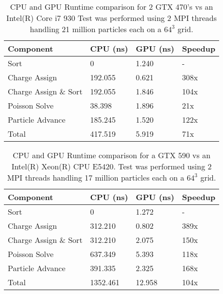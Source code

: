 \noindent \begin{table}[h]
\begin{tabular}{| p{4.0cm} | p{3.5cm} | p{2.5cm} | p{4.0cm} |}
\hline
Component & CPU (ns) & GPU (ns) & Speedup \\ \hline
Sort & 0 & 1.240 & - \\ \hline
Charge Assign & 192.055 & 0.621 & 308x \\ \hline
Charge Assign \& Sort & 192.055 & 1.846 & 104x \\ \hline
Poisson Solve & 38.398 & 1.896 & 21x \\ \hline
Particle Advance & 185.245 & 1.520 & 122x \\ \hline
Total\footnote[1] & 417.519 & 5.919 & 71x \\ \hline
\end{tabular}
\caption{CPU and GPU Runtime comparison for 2 GTX 470's vs an Intel(R) Core i7 930 Test was performed using 2 MPI threads handling 21 million particles each on a $64^3$ grid.}
\label{tab:speedup} 
\end{table}

\noindent \begin{table}[h]
\begin{tabular}{| p{4.0cm} | p{3.5cm} | p{2.5cm} | p{4.0cm} |}
\hline
Component & CPU (ns) & GPU (ns) & Speedup \\ \hline
Sort & 0 & 1.272 & - \\ \hline
Charge Assign & 312.210 & 0.802 & 389x \\ \hline
Charge Assign \& Sort & 312.210 & 2.075 & 150x \\ \hline
Poisson Solve & 637.349 & 5.393 & 118x \\ \hline
Particle Advance & 391.335 & 2.325 & 168x \\ \hline
Total\footnote[1] & 1352.461 & 12.958 & 104x \\ \hline
\end{tabular}
\caption{CPU and GPU Runtime comparison for a GTX 590 vs an Intel(R) Xeon(R) CPU E5420. Test was performed using 2 MPI threads handling 17 million particles each on a $64^3$ grid.}
\label{tab:speedup2} 
\end{table} 




\clearpage
\newpage
